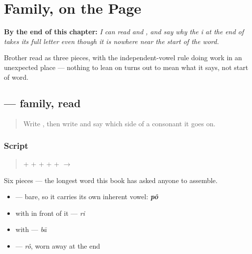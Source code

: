 
\chapter{Family, on the Page}
\label{ch:bn-family-on-the-page}

\begin{chapteropening}
\textbf{By the end of this chapter:} \emph{I can read  and , and say why the i at the end of  takes its full letter even though it is nowhere near the start of the word.}

Brother read as three pieces, with the independent-vowel rule doing work in an unexpected place — nothing to lean on turns out to mean what it says, not start of word.
\end{chapteropening}

\section[\texorpdfstring{\bn{পরিবার} (pôribār)}{পরিবার (pôribār)}]{ — family, read}

\label{lesson:BN-W04-poribar-read}



\begin{quote}
Write \textbf{}, then write \textbf{} and say which side of a consonant it goes on.
\end{quote}

\subsection*{Script}
\begin{quote}
\textbf{} + \textbf{} + \textbf{} + \textbf{} + \textbf{} + \textbf{} $\to$ \textbf{}
\end{quote}

Six pieces — the longest word this book has asked anyone to assemble.

\begin{itemize}
\raggedright
  \item \textbf{} — bare, so it carries its own inherent vowel: \emph{\textbf{pô}}
  \item \textbf{} with \textbf{} in front of it — \emph{ri}
  \item \textbf{} with \textbf{} — \emph{bā}
  \item \textbf{} — \emph{rô}, worn away at the end
\end{itemize}

